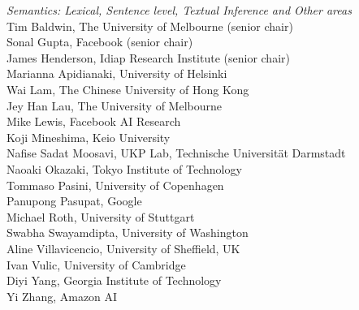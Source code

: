 \emph{Semantics: Lexical, Sentence level, Textual Inference and Other areas} \\
\hspace*{0.2in} Tim Baldwin, The University of Melbourne (senior chair)\\
\hspace*{0.2in} Sonal Gupta, Facebook (senior chair)\\
\hspace*{0.2in} James Henderson, Idiap Research Institute (senior chair)\\
\hspace*{0.2in} Marianna Apidianaki, University of Helsinki\\
\hspace*{0.2in} Wai Lam, The Chinese University of Hong Kong\\
\hspace*{0.2in} Jey Han Lau, The University of Melbourne\\
\hspace*{0.2in} Mike Lewis, Facebook AI Research\\
\hspace*{0.2in} Koji Mineshima, Keio University\\
\hspace*{0.2in} Nafise Sadat Moosavi, UKP Lab, Technische Universität Darmstadt\\
\hspace*{0.2in} Naoaki Okazaki, Tokyo Institute of Technology\\
\hspace*{0.2in} Tommaso Pasini, University of Copenhagen\\
\hspace*{0.2in} Panupong Pasupat, Google\\
\hspace*{0.2in} Michael Roth, University of Stuttgart\\
\hspace*{0.2in} Swabha Swayamdipta, University of Washington\\
\hspace*{0.2in} Aline Villavicencio, University of Sheffield, UK\\
\hspace*{0.2in} Ivan Vulic, University of Cambridge\\
\hspace*{0.2in} Diyi Yang, Georgia Institute of Technology\\
\hspace*{0.2in} Yi Zhang, Amazon AI\\

